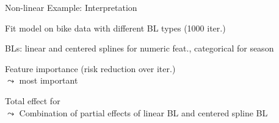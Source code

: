 \documentclass[10pt,compress,t,notes=noshow, xcolor=table]{beamer}
\begin{document}
\begin{framev}[align=top]{Non-linear Example: Interpretation}
\begin{itemizeM}
\item Fit model on bike data with different BL types (1000 iter.) %
\item BLs: linear and centered splines for numeric feat., categorical for season
\end{itemizeM}
\spacer[0.25]
\begin{itemizeM}
\item<2-> Feature importance (risk reduction over iter.)\\
$\leadsto$  most important
\item<2-> Total effect for \\
$\leadsto$ Combination of partial effects of linear BL and centered spline BL
\end{itemizeM}
\end{framev}





\end{document}
